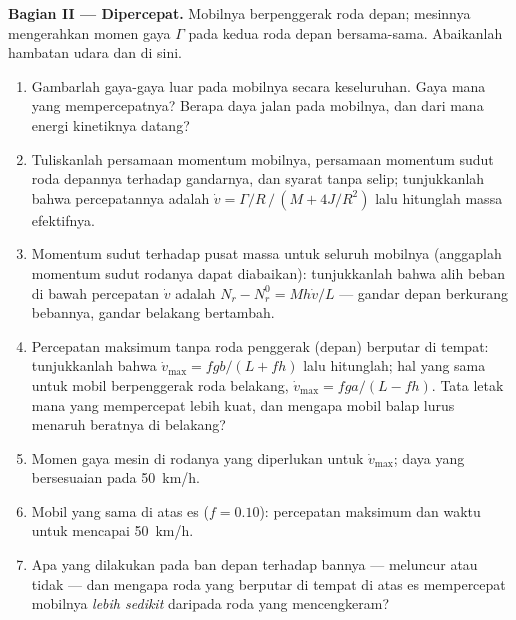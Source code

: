 \begin{problem}
\medskip
\noindent\textbf{Bagian II --- Dipercepat.}
Mobilnya berpenggerak roda depan; mesinnya mengerahkan momen gaya
$\Gamma$ pada kedua roda depan bersama-sama. Abaikanlah hambatan udara
dan  di sini.
\begin{enumerate}[resume]
  \item Gambarlah gaya-gaya luar pada mobilnya secara keseluruhan. Gaya
        mana yang mempercepatnya? Berapa daya jalan pada mobilnya, dan
        dari mana energi kinetiknya datang?
  \item Tuliskanlah persamaan momentum mobilnya, persamaan momentum
        sudut roda depannya terhadap gandarnya, dan syarat tanpa selip;
        tunjukkanlah bahwa percepatannya adalah $\dot v =
        \Gamma/R\,/\,(M + 4J/R^2)$ lalu hitunglah massa efektifnya.
  \item Momentum sudut terhadap pusat massa untuk seluruh mobilnya
        (anggaplah momentum sudut rodanya dapat diabaikan):
        tunjukkanlah bahwa alih beban di bawah percepatan $\dot v$
        adalah $N_r - N_r^0 =
        Mh\dot v/L$ --- gandar depan berkurang bebannya, gandar
        belakang bertambah.
  \item Percepatan maksimum tanpa roda penggerak (depan) berputar di
        tempat: tunjukkanlah bahwa $\dot v_{\max} = fgb/(L + fh)$ lalu
        hitunglah; hal yang sama untuk mobil berpenggerak roda
        belakang, $\dot v_{\max} =
        fga/(L - fh)$. Tata letak mana yang mempercepat lebih kuat, dan
        mengapa mobil balap lurus menaruh beratnya di belakang?
  \item Momen gaya mesin di rodanya yang diperlukan untuk
        $\dot v_{\max}$; daya yang bersesuaian pada \qty{50}{km/h}.
  \item Mobil yang sama di atas es ($f = 0.10$): percepatan maksimum
        dan waktu untuk mencapai \qty{50}{km/h}.
  \item Apa yang dilakukan  pada ban depan terhadap
        bannya --- meluncur atau tidak --- dan mengapa roda yang
        berputar di tempat di atas es mempercepat mobilnya \emph{lebih
        sedikit} daripada roda yang mencengkeram?
\end{enumerate}


\end{problem}
